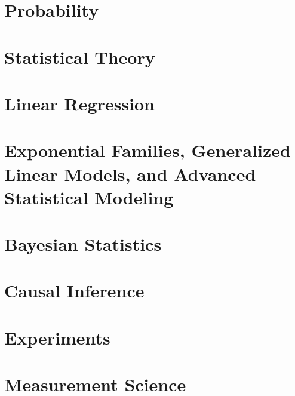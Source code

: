 \documentclass[oneside,openany]{book}
\theoremstyle{definition}
\begin{document}
\chapter{Probability}


\chapter{Statistical Theory}


\chapter{Linear Regression}


\chapter{Exponential Families, Generalized Linear Models, and Advanced Statistical Modeling}


\chapter{Bayesian Statistics}


\chapter{Causal Inference}


\chapter{Experiments}


\chapter{Measurement Science}


\end{document}
